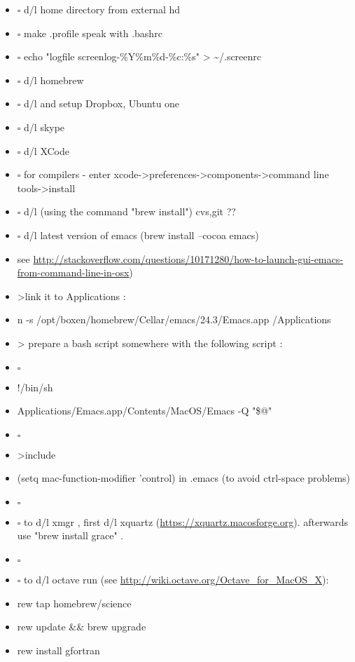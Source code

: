 \documentclass[11pt]{article}
\begin{document}
\begin{itemize}
\item $\square$ d/l home directory from external hd
\item $\square$ make .profile speak with .bashrc
\item $\square$ echo "logfile screenlog-\%Y\%m\%d-\%c:\%s" > \textasciitilde{}/.screenrc
\item $\square$ d/l homebrew
\item $\square$ d/l and setup Dropbox, Ubuntu one
\item $\square$ d/l skype
\item $\square$ d/l XCode
\item $\square$ for compilers - enter xcode->preferences->components->command line tools->install
\item $\square$ d/l (using the command "brew install") cvs,git ??
\item $\square$ d/l latest version of emacs (brew install --cocoa emacs)
\item\relax [ ]see \url{http://stackoverflow.com/questions/10171280/how-to-launch-gui-emacs-from-command-line-in-osx})
\item\relax [ ]>link it to Applications :
\item\relax [ ]n -s /opt/boxen/homebrew/Cellar/emacs/24.3/Emacs.app /Applications
\item\relax [ ]> prepare a bash script somewhere with the following script :
\item $\square$ 
\item\relax [ ]!/bin/sh
\item\relax [ ]Applications/Emacs.app/Contents/MacOS/Emacs -Q "\$@"
\item $\square$ 
\item\relax [ ]>include
\item\relax [ ](setq mac-function-modifier 'control)  in .emacs (to avoid ctrl-space problems)
\item $\square$ 
\item $\square$ to d/l xmgr , first d/l xquartz (\url{https://xquartz.macosforge.org}). afterwards use "brew install grace" .
\item $\square$ 
\item $\square$ to d/l octave run (see \url{http://wiki.octave.org/Octave_for_MacOS_X}):
\item\relax [ ]rew tap homebrew/science
\item\relax [ ]rew update \&\& brew upgrade
\item\relax [ ]rew install gfortran

\end{itemize}
\end{document}
